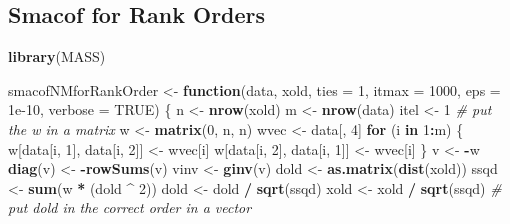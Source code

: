 \documentclass[
  12pt,
]{article}
\newenvironment{Shaded}{\begin{snugshade}}{\end{snugshade}}
\newcommand{\AttributeTok}[1]{\textcolor[rgb]{0.13,0.29,0.53}{#1}}
\newcommand{\CommentTok}[1]{\textcolor[rgb]{0.56,0.35,0.01}{\textit{#1}}}
\newcommand{\ConstantTok}[1]{\textcolor[rgb]{0.56,0.35,0.01}{#1}}
\newcommand{\ControlFlowTok}[1]{\textcolor[rgb]{0.13,0.29,0.53}{\textbf{#1}}}
\newcommand{\DecValTok}[1]{\textcolor[rgb]{0.00,0.00,0.81}{#1}}
\newcommand{\FloatTok}[1]{\textcolor[rgb]{0.00,0.00,0.81}{#1}}
\newcommand{\FunctionTok}[1]{\textcolor[rgb]{0.13,0.29,0.53}{\textbf{#1}}}
\newcommand{\NormalTok}[1]{#1}
\newcommand{\OtherTok}[1]{\textcolor[rgb]{0.56,0.35,0.01}{#1}}
\newcommand{\SpecialCharTok}[1]{\textcolor[rgb]{0.81,0.36,0.00}{\textbf{#1}}}
\begin{document}
\subsection{Smacof for Rank Orders}\label{smacof-for-rank-orders}

\begin{Shaded}
\begin{Highlighting}[]
\FunctionTok{library}\NormalTok{(MASS)}


\NormalTok{smacofNMforRankOrder }\OtherTok{\textless{}{-}}
  \ControlFlowTok{function}\NormalTok{(data,}
\NormalTok{           xold,}
           \AttributeTok{ties =} \DecValTok{1}\NormalTok{,}
           \AttributeTok{itmax =} \DecValTok{1000}\NormalTok{,}
           \AttributeTok{eps =} \FloatTok{1e{-}10}\NormalTok{,}
           \AttributeTok{verbose =} \ConstantTok{TRUE}\NormalTok{) \{}
\NormalTok{    n }\OtherTok{\textless{}{-}} \FunctionTok{nrow}\NormalTok{(xold)}
\NormalTok{    m }\OtherTok{\textless{}{-}} \FunctionTok{nrow}\NormalTok{(data)}
\NormalTok{    itel }\OtherTok{\textless{}{-}} \DecValTok{1}
    \CommentTok{\# put the w in a matrix}
\NormalTok{    w }\OtherTok{\textless{}{-}} \FunctionTok{matrix}\NormalTok{(}\DecValTok{0}\NormalTok{, n, n)}
\NormalTok{    wvec }\OtherTok{\textless{}{-}}\NormalTok{ data[, }\DecValTok{4}\NormalTok{]}
    \ControlFlowTok{for}\NormalTok{ (i }\ControlFlowTok{in} \DecValTok{1}\SpecialCharTok{:}\NormalTok{m) \{}
\NormalTok{      w[data[i, }\DecValTok{1}\NormalTok{], data[i, }\DecValTok{2}\NormalTok{]] }\OtherTok{\textless{}{-}}\NormalTok{ wvec[i]}
\NormalTok{      w[data[i, }\DecValTok{2}\NormalTok{], data[i, }\DecValTok{1}\NormalTok{]] }\OtherTok{\textless{}{-}}\NormalTok{ wvec[i]}
\NormalTok{    \}}
\NormalTok{    v }\OtherTok{\textless{}{-}} \SpecialCharTok{{-}}\NormalTok{w}
    \FunctionTok{diag}\NormalTok{(v) }\OtherTok{\textless{}{-}} \SpecialCharTok{{-}}\FunctionTok{rowSums}\NormalTok{(v)}
\NormalTok{    vinv }\OtherTok{\textless{}{-}} \FunctionTok{ginv}\NormalTok{(v)}
\NormalTok{    dold }\OtherTok{\textless{}{-}} \FunctionTok{as.matrix}\NormalTok{(}\FunctionTok{dist}\NormalTok{(xold))}
\NormalTok{    ssqd }\OtherTok{\textless{}{-}} \FunctionTok{sum}\NormalTok{(w }\SpecialCharTok{*}\NormalTok{ (dold }\SpecialCharTok{\^{}} \DecValTok{2}\NormalTok{))}
\NormalTok{    dold }\OtherTok{\textless{}{-}}\NormalTok{ dold }\SpecialCharTok{/} \FunctionTok{sqrt}\NormalTok{(ssqd)}
\NormalTok{    xold }\OtherTok{\textless{}{-}}\NormalTok{ xold }\SpecialCharTok{/} \FunctionTok{sqrt}\NormalTok{(ssqd)}
    \CommentTok{\# put dold in the correct order in a vector}

\end{Highlighting}
\end{Shaded}
\end{document}
